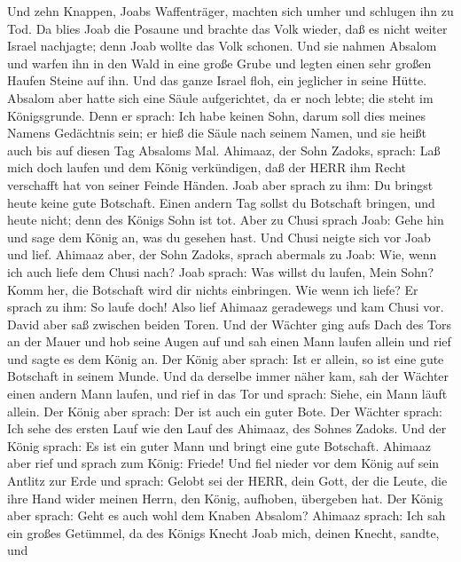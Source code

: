  Und zehn Knappen, Joabs Waffenträger, machten sich umher
und schlugen ihn zu Tod.  Da blies Joab die Posaune und
brachte das Volk wieder, daß es nicht weiter Israel nachjagte; denn Joab
wollte das Volk schonen.  Und sie nahmen Absalom und warfen
ihn in den Wald in eine große Grube und legten einen sehr großen Haufen
Steine auf ihn. Und das ganze Israel floh, ein jeglicher in seine Hütte.
 Absalom aber hatte sich eine Säule aufgerichtet, da er
noch lebte; die steht im Königsgrunde. Denn er sprach: Ich habe keinen
Sohn, darum soll dies meines Namens Gedächtnis sein; er hieß die Säule
nach seinem Namen, und sie heißt auch bis auf diesen Tag Absaloms Mal.
 Ahimaaz, der Sohn Zadoks, sprach: Laß mich doch laufen und
dem König verkündigen, daß der HERR ihm Recht verschafft hat von seiner
Feinde Händen.  Joab aber sprach zu ihm: Du bringst heute
keine gute Botschaft. Einen andern Tag sollst du Botschaft bringen, und
heute nicht; denn des Königs Sohn ist tot.  Aber zu Chusi
sprach Joab: Gehe hin und sage dem König an, was du gesehen hast. Und
Chusi neigte sich vor Joab und lief.  Ahimaaz aber, der
Sohn Zadoks, sprach abermals zu Joab: Wie, wenn ich auch liefe dem Chusi
nach? Joab sprach: Was willst du laufen, Mein Sohn? Komm her, die
Botschaft wird dir nichts einbringen.  Wie wenn ich liefe?
Er sprach zu ihm: So laufe doch! Also lief Ahimaaz geradewegs und kam
Chusi vor.  David aber saß zwischen beiden Toren. Und der
Wächter ging aufs Dach des Tors an der Mauer und hob seine Augen auf und
sah einen Mann laufen allein  und rief und sagte es dem
König an. Der König aber sprach: Ist er allein, so ist eine gute
Botschaft in seinem Munde. Und da derselbe immer näher kam,
 sah der Wächter einen andern Mann laufen, und rief in das
Tor und sprach: Siehe, ein Mann läuft allein. Der König aber sprach: Der
ist auch ein guter Bote.  Der Wächter sprach: Ich sehe des
ersten Lauf wie den Lauf des Ahimaaz, des Sohnes Zadoks. Und der König
sprach: Es ist ein guter Mann und bringt eine gute Botschaft.
 Ahimaaz aber rief und sprach zum König: Friede! Und fiel
nieder vor dem König auf sein Antlitz zur Erde und sprach: Gelobt sei
der HERR, dein Gott, der die Leute, die ihre Hand wider meinen Herrn,
den König, aufhoben, übergeben hat.  Der König aber sprach:
Geht es auch wohl dem Knaben Absalom? Ahimaaz sprach: Ich sah ein großes
Getümmel, da des Königs Knecht Joab mich, deinen Knecht, sandte, und
